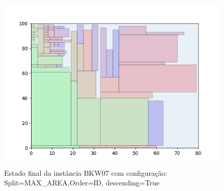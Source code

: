 \begin{figure}[H]
    \centering
    \caption[]{Estado final da instância BKW07 com configuração: Split=MAX_AREA,Order=ID, descending=True}
    \label{fig:bkw07-max_area-id-true}
    \includegraphics[scale=0.5]{output/figures/bkw/bkw07/max_area/id/true/00}
\end{figure}